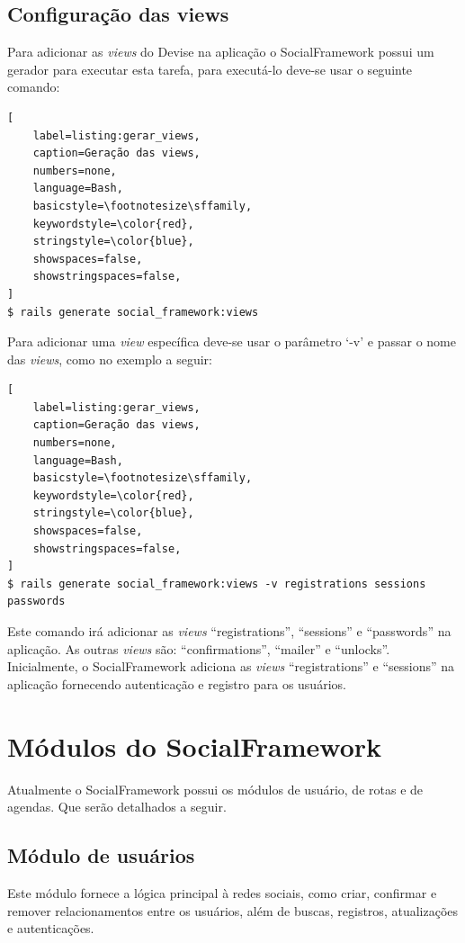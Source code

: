 \subsection{Configuração das views}

Para adicionar as \textit{views} do Devise na aplicação o SocialFramework possui um gerador para executar esta tarefa, para executá-lo deve-se usar o seguinte comando:

\begin{lstlisting}[
    label=listing:gerar_views,
    caption=Geração das views,
    numbers=none,
    language=Bash,
    basicstyle=\footnotesize\sffamily,
    keywordstyle=\color{red},
    stringstyle=\color{blue},
    showspaces=false,
    showstringspaces=false,
]
$ rails generate social_framework:views
\end{lstlisting}

Para adicionar uma \textit{view} específica deve-se usar o parâmetro `-v' e passar o nome das \textit{views}, como no exemplo a seguir:

\begin{lstlisting}[
    label=listing:gerar_views,
    caption=Geração das views,
    numbers=none,
    language=Bash,
    basicstyle=\footnotesize\sffamily,
    keywordstyle=\color{red},
    stringstyle=\color{blue},
    showspaces=false,
    showstringspaces=false,
]
$ rails generate social_framework:views -v registrations sessions passwords
\end{lstlisting}

Este comando irá adicionar as \textit{views} ``registrations'', ``sessions'' e ``passwords'' na aplicação. As outras \textit{views} são: ``confirmations'', ``mailer'' e ``unlocks''. Inicialmente, o SocialFramework adiciona as \textit{views} ``registrations'' e ``sessions'' na aplicação fornecendo autenticação e registro para os usuários.

\section{Módulos do SocialFramework}
\label{sec:modulos_socialframework}

Atualmente o SocialFramework possui os módulos de usuário, de rotas e de agendas. Que serão detalhados a seguir.

\subsection{Módulo de usuários}

Este módulo fornece a lógica principal à redes sociais, como criar, confirmar e remover relacionamentos entre os usuários, além de buscas, registros, atualizações e autenticações.


